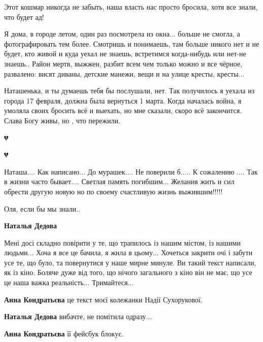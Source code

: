 
Этот кошмар никогда не забыть, наша власть нас просто бросила, хотя все знали, что будет ад!


Я дома, в городе летом, один раз посмотрела из окна... больше не смогла, а
фотографировать тем более. Смотришь и понимаешь, там больше никого нет и не
будет, кто живой и куда уехал не знаешь, встретимся когда-нибудь или нет-не
знаешь.. Район мертв, выжжен, разбит всем чем только можно и все
чёрное, развалено: висят диваны, детские манежи, вещи и на улице кресты, кресты...


Наташенька, и ты думаешь тебя бы послушали, нет. Так получилось я уехала из
города 17 февраля, должна была вернуться 1 марта. Когда началась война, я
умоляла своих бросить всё и выехать, но мне сказали, скоро всё закончится.
Слава Богу живы, но , что пережили.

💔

💔


Наташа.... Как написано... До мурашек.... Не поверили б..... К сожалению ....
Так в жизни часто бывает.... Светлая память погибшим... Желания жить и сил
обрести другую новую но по своему счастливую жизнь выжившим!!!!!


Оля, если бы мы знали..

\textbf{Наталья Дедова} 

Мені досі складно повірити у те, що трапилось із нашим містом, із нашими
людьми... Хоча я все це бачила, я жила в цьому... Хочеться закрити очі і забути
усе те, що було, та повернутися у наше мирне минуле. Ви такий текст написали,
як із кіно. Боляче дуже від того, що нічого загального з кіно він не має, що
усе це наша важка реальність... Тримайтеся...

\begin{itemize} %
\textbf{Анна Кондратьєва} це текст моєї колежанки Надії Сухорукової.

\textbf{Наталья Дедова} вибачте, не помітила одразу...

\textbf{Анна Кондратьєва} її фейсбук блокує.
\end{itemize} %


